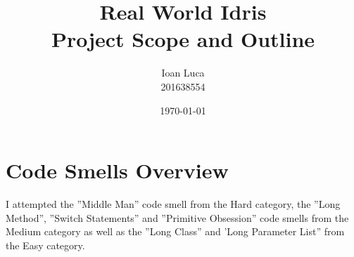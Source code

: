 \documentclass[a4paper]{article}
\begin{document}
\title{Real World Idris \\ Project Scope and Outline}
\author{Ioan Luca \\ \small 201638554}
\date{\today}
\maketitle











\section{Code Smells Overview}
I attempted the ''Middle Man'' code smell from the Hard category,
the ''Long Method'', ''Switch Statements'' and ''Primitive Obsession'' code smells
from the Medium category as well as
the ''Long Class'' and 'Long Parameter List'' from the Easy category.
\end{document}
